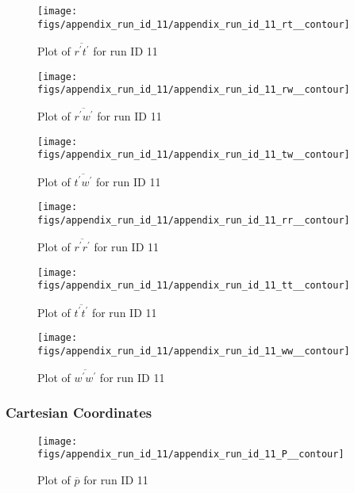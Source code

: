 \begin{figure}[H]
\centering
\texttt{[image: figs/appendix\_run\_id\_11/appendix\_run\_id\_11\_rt\_\_contour]}
\caption{Plot of $\overline{r^\prime t^\prime}$ for run ID 11}
\label{fig:appendix_run_id_11_rt__contour}
\end{figure}


\begin{figure}[H]
\centering
\texttt{[image: figs/appendix\_run\_id\_11/appendix\_run\_id\_11\_rw\_\_contour]}
\caption{Plot of $\overline{r^\prime w^\prime}$ for run ID 11}
\label{fig:appendix_run_id_11_rw__contour}
\end{figure}


\begin{figure}[H]
\centering
\texttt{[image: figs/appendix\_run\_id\_11/appendix\_run\_id\_11\_tw\_\_contour]}
\caption{Plot of $\overline{t^\prime w^\prime}$ for run ID 11}
\label{fig:appendix_run_id_11_tw__contour}
\end{figure}


\begin{figure}[H]
\centering
\texttt{[image: figs/appendix\_run\_id\_11/appendix\_run\_id\_11\_rr\_\_contour]}
\caption{Plot of $\overline{r^\prime r^\prime}$ for run ID 11}
\label{fig:appendix_run_id_11_rr__contour}
\end{figure}


\begin{figure}[H]
\centering
\texttt{[image: figs/appendix\_run\_id\_11/appendix\_run\_id\_11\_tt\_\_contour]}
\caption{Plot of $\overline{t^\prime t^\prime}$ for run ID 11}
\label{fig:appendix_run_id_11_tt__contour}
\end{figure}


\begin{figure}[H]
\centering
\texttt{[image: figs/appendix\_run\_id\_11/appendix\_run\_id\_11\_ww\_\_contour]}
\caption{Plot of $\overline{w^\prime w^\prime}$ for run ID 11}
\label{fig:appendix_run_id_11_ww__contour}
\end{figure}


\subsubsection{Cartesian Coordinates}
\begin{figure}[H]
\centering
\texttt{[image: figs/appendix\_run\_id\_11/appendix\_run\_id\_11\_P\_\_contour]}
\caption{Plot of $\overline{p}$ for run ID 11}
\label{fig:appendix_run_id_11_P__contour}
\end{figure}



